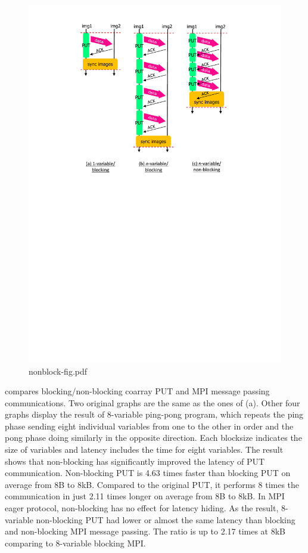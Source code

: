 \begin{figure}[tbh]
  \begin{center}
    \mbox{\includegraphics[trim=43mm 144mm 43mm 3mm, scale=0.6,clip]{figs/nonblock-fig-r2.pdf}}
    \caption{nonblock-fig.pdf}\label{fig:nonblock-fig}
  \end{center}
\end{figure}


 compares blocking/non-blocking coarray PUT and 
MPI message passing communications.
Two original graphs are the same as the ones of  (a).
Other four graphs display the result of 8-variable ping-pong program, 
which repeats the ping phase sending eight individual variables 
from one to the other in order and the pong phase doing similarly 
in the opposite direction.
Each blocksize indicates the size of variables and latency includes the
time for eight variables.
%
The result shows that non-blocking has significantly improved the latency of 
PUT communication. 
Non-blocking PUT is 4.63 times faster than blocking PUT on average from 8B to 8kB. 
Compared to the original PUT, it performs 8 times the communication in just 
2.11 times longer on average from 8B to 8kB.
%
In MPI eager protocol, non-blocking has no effect for latency hiding.
As the result, 8-variable non-blocking PUT had lower or almost the same 
latency than blocking and non-blocking MPI message passing.
The ratio is up to 2.17 times at 8kB comparing to 8-variable blocking MPI.

